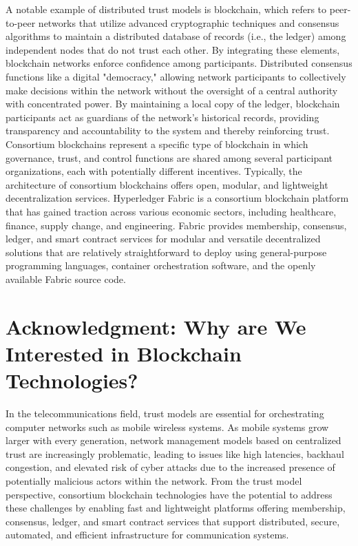 \documentclass[conference]{IEEEtran}
\begin{document}
A notable example of distributed trust models is blockchain, which refers to peer-to-peer networks that utilize advanced cryptographic techniques and consensus algorithms to maintain a distributed database of records (i.e., the ledger) among independent nodes that do not trust each other. By integrating these elements, blockchain networks enforce confidence among participants. Distributed consensus functions like a digital "democracy," allowing network participants to collectively make decisions within the network without the oversight of a central authority with concentrated power. By maintaining a local copy of the ledger, blockchain participants act as guardians of the network's historical records, providing transparency and accountability to the system and thereby reinforcing trust. \\

Consortium blockchains represent a specific type of blockchain in which governance, trust, and control functions are shared among several participant organizations, each with potentially different incentives. Typically, the architecture of consortium blockchains offers open, modular, and lightweight decentralization services. Hyperledger Fabric is a consortium blockchain platform that has gained traction across various economic sectors, including healthcare, finance, supply change, and engineering. Fabric provides membership, consensus, ledger, and smart contract services for modular and versatile decentralized solutions that are relatively straightforward to deploy using general-purpose programming languages, container orchestration software, and the openly available Fabric source code. 
\section*{Acknowledgment: Why are We Interested in Blockchain Technologies?}
In the telecommunications field, trust models are essential for orchestrating computer networks such as mobile wireless systems. As mobile systems grow larger with every generation, network management models based on centralized trust are increasingly problematic, leading to issues like high latencies, backhaul congestion, and elevated risk of cyber attacks due to the increased presence of potentially malicious actors within the network. From the trust model perspective, consortium blockchain technologies have the potential to address these challenges by enabling fast and lightweight platforms offering membership, consensus, ledger, and smart contract services that support distributed, secure, automated, and efficient infrastructure for communication systems. \\
\end{document}
